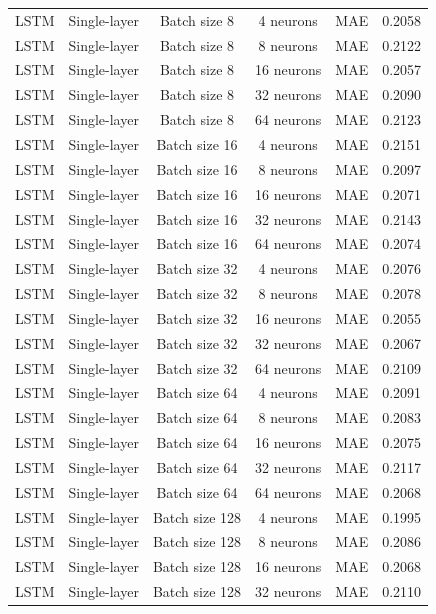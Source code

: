 \begin{landscape}
\begin{longtable}{llcccc}
LSTM & Single-layer & Batch size 8   & 4 neurons  & MAE  & 0.2058 \\
LSTM & Single-layer & Batch size 8   & 8 neurons  & MAE  & 0.2122 \\
LSTM & Single-layer & Batch size 8   & 16 neurons & MAE  & 0.2057 \\
LSTM & Single-layer & Batch size 8   & 32 neurons & MAE  & 0.2090 \\
LSTM & Single-layer & Batch size 8   & 64 neurons & MAE  & 0.2123 \\
LSTM & Single-layer & Batch size 16  & 4 neurons  & MAE  & 0.2151 \\
LSTM & Single-layer & Batch size 16  & 8 neurons  & MAE  & 0.2097 \\
LSTM & Single-layer & Batch size 16  & 16 neurons & MAE  & 0.2071 \\
LSTM & Single-layer & Batch size 16  & 32 neurons & MAE  & 0.2143 \\
LSTM & Single-layer & Batch size 16  & 64 neurons & MAE  & 0.2074 \\
LSTM & Single-layer & Batch size 32  & 4 neurons  & MAE  & 0.2076 \\
LSTM & Single-layer & Batch size 32  & 8 neurons  & MAE  & 0.2078 \\
LSTM & Single-layer & Batch size 32  & 16 neurons & MAE  & 0.2055 \\
LSTM & Single-layer & Batch size 32  & 32 neurons & MAE  & 0.2067 \\
LSTM & Single-layer & Batch size 32  & 64 neurons & MAE  & 0.2109 \\
LSTM & Single-layer & Batch size 64  & 4 neurons  & MAE  & 0.2091 \\
LSTM & Single-layer & Batch size 64  & 8 neurons  & MAE  & 0.2083 \\
LSTM & Single-layer & Batch size 64  & 16 neurons & MAE  & 0.2075 \\
LSTM & Single-layer & Batch size 64  & 32 neurons & MAE  & 0.2117 \\
LSTM & Single-layer & Batch size 64  & 64 neurons & MAE  & 0.2068 \\
LSTM & Single-layer & Batch size 128 & 4 neurons  & MAE  & 0.1995 \\
LSTM & Single-layer & Batch size 128 & 8 neurons  & MAE  & 0.2086 \\
LSTM & Single-layer & Batch size 128 & 16 neurons & MAE  & 0.2068 \\
LSTM & Single-layer & Batch size 128 & 32 neurons & MAE  & 0.2110 \\

\end{longtable}
\end{landscape}
